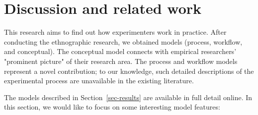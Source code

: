 \section{Discussion and related work}\label{sec-related}
This research aims to find out how experimenters work in practice. After conducting the ethnographic research, we obtained models (process, workflow, and conceptual). The conceptual model connects with empirical researchers' "prominent picture" of their research area. The process and workflow models represent a novel contribution; to our knowledge, such detailed descriptions of the experimental process are unavailable in the existing literature.

The models described in Section~\ref{sec-results} are available in full detail online. In this section, we would like to focus on some interesting model features:

